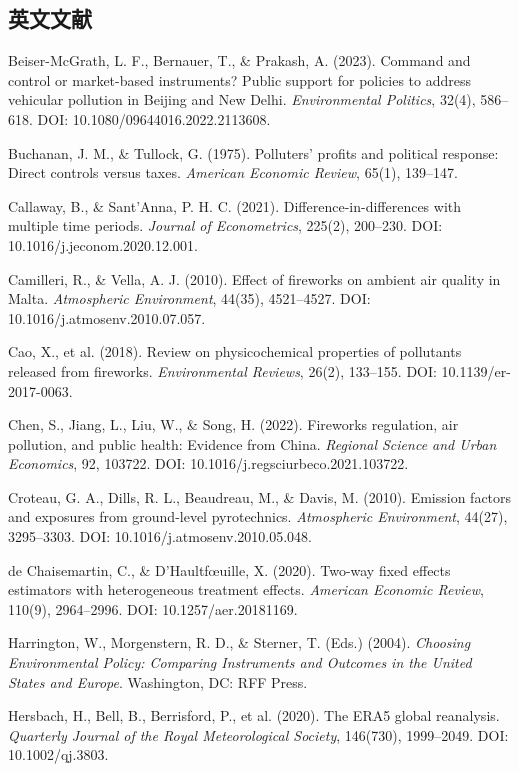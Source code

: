 \begin{list}{}{\setlength{\leftmargin}{2.2em}\setlength{\itemindent}{-2.2em}\setlength{\itemsep}{0.35em}\raggedright\sloppy}
\subsection*{英文文献}

\item Beiser-McGrath, L. F., Bernauer, T., \& Prakash, A. (2023). Command and control or market-based instruments? Public support for policies to address vehicular pollution in Beijing and New Delhi. \emph{Environmental Politics}, 32(4), 586--618. DOI: 10.1080/09644016.2022.2113608.
\item Buchanan, J. M., \& Tullock, G. (1975). Polluters' profits and political response: Direct controls versus taxes. \emph{American Economic Review}, 65(1), 139--147.
\item Callaway, B., \& Sant'Anna, P. H. C. (2021). Difference-in-differences with multiple time periods. \emph{Journal of Econometrics}, 225(2), 200--230. DOI: 10.1016/j.jeconom.2020.12.001.
\item Camilleri, R., \& Vella, A. J. (2010). Effect of fireworks on ambient air quality in Malta. \emph{Atmospheric Environment}, 44(35), 4521--4527. DOI: 10.1016/j.atmosenv.2010.07.057.
\item Cao, X., et al. (2018). Review on physicochemical properties of pollutants released from fireworks. \emph{Environmental Reviews}, 26(2), 133--155. DOI: 10.1139/er-2017-0063.
\item Chen, S., Jiang, L., Liu, W., \& Song, H. (2022). Fireworks regulation, air pollution, and public health: Evidence from China. \emph{Regional Science and Urban Economics}, 92, 103722. DOI: 10.1016/j.regsciurbeco.2021.103722.
\item Croteau, G. A., Dills, R. L., Beaudreau, M., \& Davis, M. (2010). Emission factors and exposures from ground-level pyrotechnics. \emph{Atmospheric Environment}, 44(27), 3295--3303. DOI: 10.1016/j.atmosenv.2010.05.048.
\item de Chaisemartin, C., \& D'Haultf\oe uille, X. (2020). Two-way fixed effects estimators with heterogeneous treatment effects. \emph{American Economic Review}, 110(9), 2964--2996. DOI: 10.1257/aer.20181169.
\item Harrington, W., Morgenstern, R. D., \& Sterner, T. (Eds.) (2004). \emph{Choosing Environmental Policy: Comparing Instruments and Outcomes in the United States and Europe}. Washington, DC: RFF Press.
\item Hersbach, H., Bell, B., Berrisford, P., et al. (2020). The ERA5 global reanalysis. \emph{Quarterly Journal of the Royal Meteorological Society}, 146(730), 1999--2049. DOI: 10.1002/qj.3803.

\end{list}
